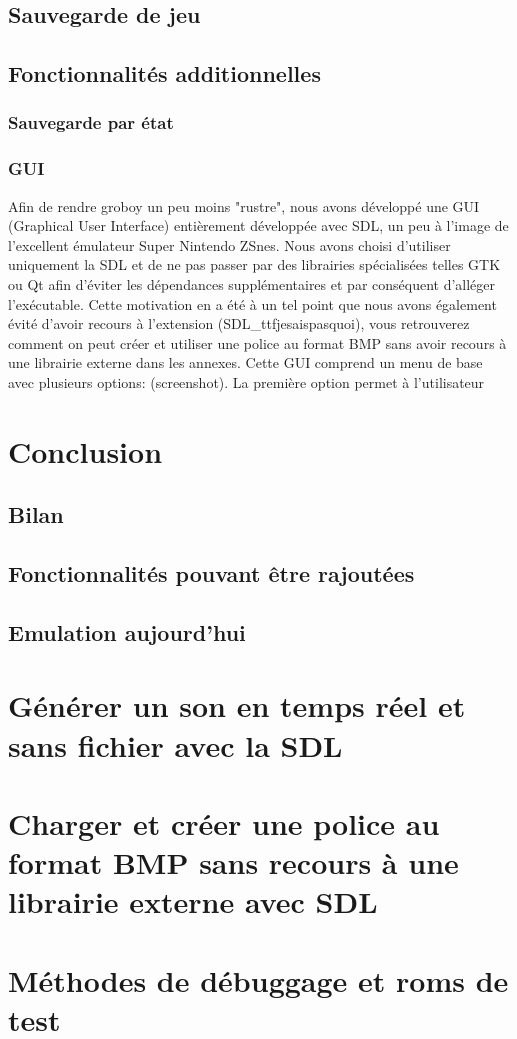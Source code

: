 \documentclass{report}
\begin{document}
\section{Sauvegarde de jeu}
\section{Fonctionnalités additionnelles}
\subsection{Sauvegarde par état}
\subsection{GUI}
Afin de rendre groboy un peu moins "rustre", nous avons développé une GUI (Graphical User Interface) entièrement développée avec SDL, un peu à l'image de l'excellent émulateur Super Nintendo ZSnes. Nous avons choisi d'utiliser uniquement la SDL et de ne pas passer par des librairies spécialisées telles GTK ou Qt afin d'éviter les dépendances supplémentaires et par conséquent d'alléger l'exécutable. Cette motivation en a été à un tel point que nous avons également évité d'avoir recours à l'extension (SDL\_ttfjesaispasquoi), vous retrouverez comment on peut créer et utiliser une police au format BMP sans avoir recours à une librairie externe dans les annexes. Cette GUI comprend un menu de base avec plusieurs options: (screenshot). 
La première option permet à l'utilisateur 
\chapter{Conclusion}
\section{Bilan}
\section{Fonctionnalités pouvant être rajoutées}
\section{Emulation aujourd'hui}


\appendix
\chapter{Générer un son en temps réel et sans fichier avec la SDL}
\chapter{Charger et créer une police au format BMP sans recours à une librairie externe avec SDL}
\chapter{Méthodes de débuggage et roms de test}
\end{document}
